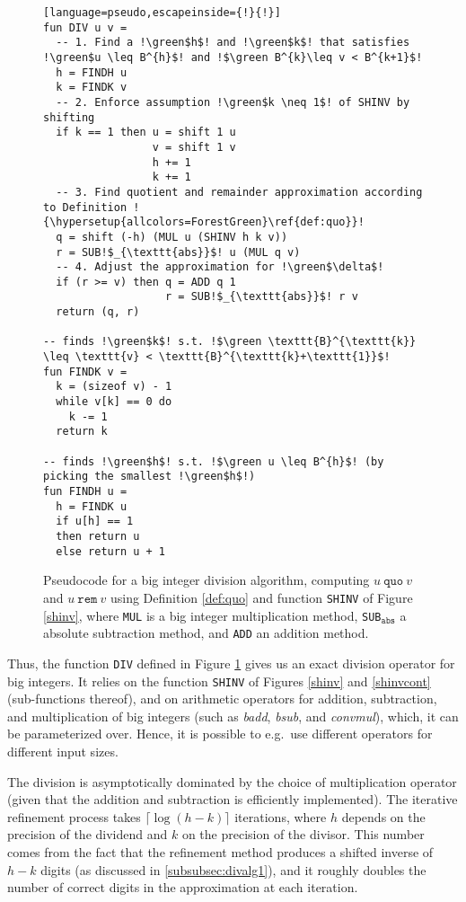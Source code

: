 \begin{figure}
\begin{lstlisting}[language=pseudo,escapeinside={!}{!}]
fun DIV u v =
  -- 1. Find a !\green$h$! and !\green$k$! that satisfies !\green$u \leq B^{h}$! and !$\green B^{k}\leq v < B^{k+1}$!
  h = FINDH u
  k = FINDK v
  -- 2. Enforce assumption !\green$k \neq 1$! of SHINV by shifting
  if k == 1 then u = shift 1 u
                 v = shift 1 v
                 h += 1
                 k += 1
  -- 3. Find quotient and remainder approximation according to Definition !{\hypersetup{allcolors=ForestGreen}\ref{def:quo}}!
  q = shift (-h) (MUL u (SHINV h k v))
  r = SUB!$_{\texttt{abs}}$! u (MUL q v)
  -- 4. Adjust the approximation for !\green$\delta$!
  if (r >= v) then q = ADD q 1
                   r = SUB!$_{\texttt{abs}}$! r v
  return (q, r)

-- finds !\green$k$! s.t. !$\green \texttt{B}^{\texttt{k}} \leq \texttt{v} < \texttt{B}^{\texttt{k}+\texttt{1}}$!
fun FINDK v =
  k = (sizeof v) - 1
  while v[k] == 0 do
    k -= 1
  return k

-- finds !\green$h$! s.t. !$\green u \leq B^{h}$! (by picking the smallest !\green$h$!)
fun FINDH u =
  h = FINDK u
  if u[h] == 1
  then return u
  else return u + 1
\end{lstlisting}
  \caption{\footnotesize Pseudocode for a big integer division algorithm, computing $u~\mathtt{quo}~v$ and $u~ \mathtt{rem}~ v$ using Definition \ref{def:quo} and function \texttt{SHINV} of Figure \ref{shinv}, where \texttt{MUL} is a big integer multiplication method, \texttt{SUB}$_{\mathtt{abs}}$ a absolute subtraction method, and \texttt{ADD} an addition method.}
  \label{div}
\end{figure}

\bigskip

Thus, the function \texttt{DIV} defined in Figure \ref{div} gives us an exact
division operator for big integers. It relies on the function \texttt{SHINV} of
Figures \ref{shinv} and \ref{shinvcont} (sub-functions thereof), and on
arithmetic operators for addition, subtraction, and multiplication of big
integers (such as \textit{badd}, \textit{bsub}, and \textit{convmul}), which, it
can be parameterized over. Hence, it is possible to e.g.\ use different
operators for different input sizes.

The division is asymptotically dominated by the choice of multiplication operator (given
that the addition and subtraction is efficiently implemented). The iterative
refinement process takes $\lceil \log (h-k) \rceil$ iterations, where $h$ depends on the
precision of the dividend and $k$ on the precision of the divisor. This number
comes from the fact that the refinement method produces a shifted inverse of
$h-k$ digits (as discussed in \ref{subsubsec:divalg1}), and it roughly doubles
the number of correct digits in the approximation at each iteration.

